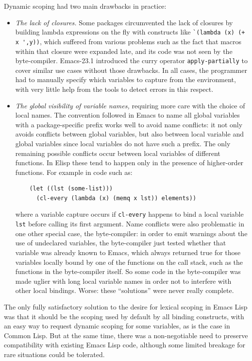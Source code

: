 \documentclass[format=acmsmall, review]{acmart}
\newcommand \Elisp {Emacs Lisp}
\begin{document}
Dynamic scoping had two main drawbacks in practice:
\begin{itemize}
\item \textit{The lack of closures.}
  Some packages circumvented the lack of closures
  by building lambda expressions on the fly with constructs like
  \verb|`(lambda (x) (+ x ',y))|, which suffered from various problems
  such as the fact that macros within that closure were expanded late, and
  its code was not seen by the byte-compiler.  Emacs-23.1 introduced the
  curry operator \texttt{apply-partially} to cover similar use cases without
  those drawbacks.  In all cases, the programmer had to manually specify
  which variables to capture from the environment, with very little help
  from the tools to detect errors in this respect.
\item \textit{The global visibility of variable names,} requiring more care with the
  choice of local names.  The convention followed in Emacs to name all
  global variables with a package-specific prefix works well to avoid name
  conflicts: it not only avoids conflicts between global variables, but also
  between local variable and global variables since local variables do not
  have such a prefix.  The only remaining possible conflicts occur between
  local variables of different functions.  In Elisp these tend to happen only
  in the presence of higher-order functions.  For example in code such as:
\begin{verbatim}
    (let ((lst (some-list)))
      (cl-every (lambda (x) (memq x lst)) elements))
\end{verbatim}
  where a variable capture occurs if \texttt{cl-every} happens to bind a local
  variable \texttt{lst} before calling its first argument.  Name conflicts
  were also problematic in one other special case, the byte-compiler: in
  order to emit warnings about the use of undeclared variables, the
  byte-compiler just tested whether that variable was already known to
  Emacs, which always returned true for those variables locally bound by one
  of the functions on the call stack, such as the functions in the
  byte-compiler itself.  So some code in the byte-compiler was made uglier
  with long local variable names in order not to interfere with other local
  bindings.  Worse: these ``solutions'' were never really complete.
\end{itemize}
The only fully satisfactory solution to the desire for lexical scoping in
\Elisp{} was that it should be the scoping used by default by all binding
constructs, with an easy way to request dynamic scoping for some
variables, as is the case in Common Lisp.  But at the same time, there was
a non-negotiable need to preserve compatibility with existing \Elisp{} code,
although some limited breakage for rare situations could be tolerated.
\end{document}
